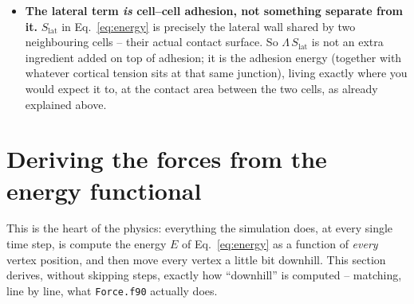\documentclass[11pt,a4paper]{report}
\begin{document}
\begin{physbox}
\begin{itemize}[leftmargin=1.4em]
  model anything from a perfectly symmetric apical--basal tissue
  (set them equal -- the code's own default if you omit the basal
  keys from \texttt{para.in}) to a strongly polarised one (e.g. a
  much stiffer or more contractile basal side, representing a real
  basement membrane), and to see the difference for yourself
  (Section~\ref{sec:basal-benchmark} does exactly that).
  \item \textbf{The lateral term \emph{is} cell--cell adhesion, not
  something separate from it.} $S_{\mathrm{lat}}$ in
  Eq.~\ref{eq:energy} is precisely the lateral wall shared by two
  neighbouring cells -- their actual contact surface. So
  $\Lambda\,S_{\mathrm{lat}}$ is not an extra ingredient added on top of
  adhesion; it is the adhesion energy (together with whatever cortical
  tension sits at that same junction), living exactly where you would
  expect it to, at the contact area between the two cells, as already
  explained above.
\end{itemize}
\end{physbox}

\section{Deriving the forces from the energy functional}
\label{sec:forces}

This is the heart of the physics: everything the simulation does, at
every single time step, is compute the energy $E$ of
Eq.~\ref{eq:energy} as a function of \emph{every} vertex position, and
then move every vertex a little bit downhill. This section derives,
without skipping steps, exactly how ``downhill'' is computed --
matching, line by line, what \texttt{Force.f90} actually does.
\end{document}
